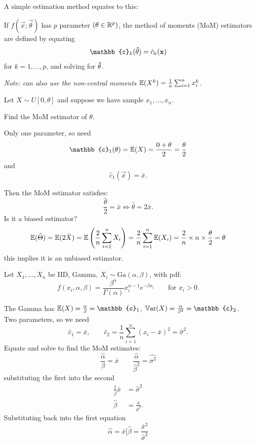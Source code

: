 \documentclass[10pt, a4paper]{article}
\begin{document}
A simple estimation method equates to this:
\begin{definition}
    If $f(\vec{x}; \vec{\theta})$ has $p$ parameter $(\mathbf{\theta} \in \mathbb{R} ^ p)$,
    the method of moments
    (MoM)
    estimators are defined by equating
    \[
    \mathbb{c}_k(\hvec{\theta}) = \hat{c}_k(\vec{x})
    \]
    for $k = 1, \dotsc, p$,
    and solving for $\mathbf{\hat{\theta}}$.
\end{definition}
\textit{Note:
can also use the non-central moments $\mathbb{E}(X ^ k) = \frac{1}{n}\sum_{i = 1}^{n}x_i ^ k$.}

\begin{example}
    Let $X \sim U[0, \theta]$ and suppose we have sample $x_1, \dotsc, x_n$.

    Find the MoM estimator of $\theta$.

    \begin{solution}
        Only one parameter,
        so need
        \[
        \mathbb{c}_1(\theta) = \E(X) = \frac{0 + \theta}{2} = \frac{\theta}{2}
        \]
        and
        \[
        \hat{c}_1(\vec{x}) = \bar{x}.
        \]

        Then the MoM estimator satisfies\footnotemark:
        \[
        \frac{\hat{\theta}}{2} = \bar{x} \iff \hat{\theta} = 2\bar{x}.
        \]
        Is it a biased estimator?
        \[
        \mathbb{E}(\hat{\Theta}) = \mathbb{E}(2\bar{X}) = \mathbb{E}\left(\frac{2}{n}\sum_{i = 1}^{n}X_i\right) = \frac{2}{n}\sum_{i = 1}^{n}\mathbb{E}(X_i) = \frac{2}{n} \times n \times \frac{\theta}{2} = \theta
        \]
        this implies it is an unbiased estimator.
    \end{solution}
\end{example}

\begin{example}
    Let $X_1, \dotsc, X_n$ be IID,
    Gamma,
    $X_i \sim \mathrm{Ga}(\alpha, \beta)$,
    with pdf:
    \[
    f(x_i, \alpha, \beta) = \frac{\beta ^ {\alpha}}{\Gamma(\alpha)}x_i ^ {\alpha - 1}e ^ {-\beta x_i}\qquad\text{for } x_i > 0.
    \]

    \begin{solution}
        The Gamma has $\E(X) = \frac{\alpha}{\beta} = \mathbb{c}_1$,
        $\Var(X) = \frac{\alpha}{\beta ^ 2} = \mathbb{c}_2$.
        Two parameters,
        so we need
        \[
        \hat{c}_1 = \bar{x},\qquad\hat{c}_2 = \frac{1}{n}\sum_{i = 1}^{n}(x_i - \bar{x}) ^ 2 = \hat{\sigma} ^ 2.
        \]
        Equate and solve to find the MoM estimates:
        \[
        \frac{\hat{\alpha}}{\beta} = \bar{x}\qquad \frac{\hat{\alpha}}{\hat{\beta} ^ 2} = \hat{\sigma ^ 2}
        \]
        substituting the first into the second
        \begin{align*}
            \frac{1}{\hat{\beta}}\bar{x} &= \hat{\sigma} ^ 2 \\
            \hat{\beta} &= \frac{\bar{x}}{\hat{\sigma} ^ 2}.
        \end{align*}
        Substituting back into the first equation
        \[
        \hat{\alpha} = \bar{x}]\hat{\beta} = \frac{\bar{x} ^ 2}{\hat{\sigma} ^ 2}
        \]
    \end{solution}
\end{example}
\end{document}
